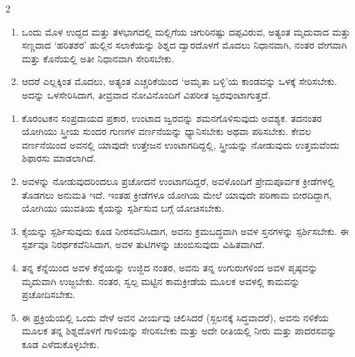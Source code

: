 \newpage

\begin{multicols}{2}
\begin{kan}
\begin{enumerate}[nosep]
\item[18.] ಒಂದು ಮೊಳ ಉದ್ದದ ಮತ್ತು ತಳಭಾಗದಲ್ಲಿ ಮಲ್ಲಿಗೆಯ ಚಿಗುರಿನಷ್ಟು ದಪ್ಪವಿರುವ, ಅತ್ಯಂತ ಮೃದುವಾದ ಮತ್ತು ಸಣ್ಣದಾದ ‘ಹರಿತಶರ’ ಹುಲ್ಲಿನ ಸಲಾಕೆಯನ್ನು ಶಿಶ್ನದ ದ್ವಾರದೊಳಗೆ ಮೊದಲು ನಿಧಾನವಾಗಿ, ನಂತರ ವೇಗವಾಗಿ ಮತ್ತು ಕೊನೆಯಲ್ಲಿ ಅತೀ ನಿಧಾನವಾಗಿ ಸೇರಿಸಬೇಕು.
\item[19.] ಆದರೆ ಎಲ್ಲಕ್ಕಿಂತ ಮೊದಲು, ಅತ್ಯಂತ ಎಚ್ಚರಿಕೆಯಿಂದ ‘ಅಮೃತಾ ಬಳ್ಳಿ’ಯ ಕಾಂಡವನ್ನು ಒಳಕ್ಕೆ ಸೇರಿಸಬೇಕು. ಅದನ್ನು ಒಳಸೇರಿಸಿದಾಗ, ತೀವ್ರವಾದ ನೋವಿನೊಂದಿಗೆ ವಿಪರೀತ ಜ್ವರವುಂಟಾಗುತ್ತದೆ.
\end{enumerate}
\vskip 7pt

\vskip 7pt


\begin{enumerate}[nosep]
\item[20.] ಕೊರಂಟಕನ ಸಂಪ್ರದಾಯದ ಪ್ರಕಾರ, ಉಂಟಾದ ಜ್ವರವನ್ನು ಶಮನಗೊಳಿಸುವುದು ಅವಶ್ಯಕ. ತದನಂತರ ಯೋಗಿಯು ಸ್ತ್ರೀಯ ಸುಂದರ ಗುಣಗಳ ವರ್ಣನೆಯನ್ನು ಧ್ಯಾನಿಸಬೇಕು ಅಥವಾ ಪಠಿಸಬೇಕು. ಕೇವಲ ವರ್ಣನೆಯಿಂದ ಅವನಲ್ಲಿ ಯಾವುದೇ ಉತ್ತೇಜನ ಉಂಟಾಗದಿದ್ದಲ್ಲಿ, ಸ್ತ್ರೀಯನ್ನು ನೋಡುವುದು ಉತ್ತಮವೆಂದು ಶಿಫಾರಸು ಮಾಡಲಾಗಿದೆ.
\item[21.] ಅವಳನ್ನು ನೋಡುವುದರಿಂದಲೂ ಪ್ರಚೋದನೆ ಉಂಟಾಗದಿದ್ದರೆ, ಅವಳೊಂದಿಗೆ ಪ್ರೇಮಪೂರ್ವಕ ಕ್ರೀಡೆಗಳಲ್ಲಿ ತೊಡಗಲು ಅನುಮತಿ ಇದೆ. ಇಂತಹ ಕ್ರೀಡೆಗಳೂ ಯೋಗಿಯ ಮೇಲೆ ಯಾವುದೇ ಪರಿಣಾಮ ಬೀರದಿದ್ದಾಗ, ಯೋಗಿಯು ಯುವತಿಯ ಕೈಯನ್ನು ಸ್ಪರ್ಶಿಸುವ ಬಗ್ಗೆ ಯೋಚಿಸಬೇಕು.
\item[22.] ಕೈಯನ್ನು ಸ್ಪರ್ಶಿಸುವುದು ಕೂಡ ನೀರಸವೆನಿಸಿದಾಗ, ಅವನು ಕ್ರಮಬದ್ಧವಾಗಿ ಅವಳ ಸ್ತನಗಳನ್ನು ಸ್ಪರ್ಶಿಸಬೇಕು. ಈ ಸ್ಪರ್ಶವೂ ನಿರರ್ಥಕವೆನಿಸಿದಾಗ, ಅವಳ ತುಟಿಗಳನ್ನು ಚುಂಬಿಸುವುದು ವಿಹಿತವಾಗಿದೆ.
\item[23.] ತನ್ನ ಕೆನ್ನೆಯಿಂದ ಅವಳ ಕೆನ್ನೆಯನ್ನು ಉಜ್ಜಿದ ನಂತರ, ಅವನು ತನ್ನ ಉಗುರುಗಳಿಂದ ಅವಳ ಪೃಷ್ಠವನ್ನು ಮೃದುವಾಗಿ ಉಜ್ಜಬೇಕು. ನಂತರ, ಸ್ವಲ್ಪ ಮಟ್ಟಿನ ಕಾಮಕ್ರೀಡೆಯ ಮೂಲಕ ಅವಳಲ್ಲಿ ಕಾಮವನ್ನು ಪ್ರಚೋದಿಸಬೇಕು.
\item[24.] ಈ ಪ್ರಕ್ರಿಯೆಯಲ್ಲಿ ಒಂದು ವೇಳೆ ಅವನ ವೀರ್ಯವು ಚಲಿಸಿದರೆ (ಸ್ಖಲನಕ್ಕೆ ಸಿದ್ಧವಾದರೆ), ಅವನು ನಳಿಕೆಯ ಮೂಲಕ ತನ್ನ ಶಿಶ್ನದೊಳಗೆ ಗಾಳಿಯನ್ನು ಸೇರಿಸಬೇಕು ಮತ್ತು ಅದೇ ರೀತಿಯಲ್ಲಿ ನೀರು ಮತ್ತು ಪಾದರಸವನ್ನು ಕೂಡ ಎಳೆದುಕೊಳ್ಳಬೇಕು.
\end{enumerate}
\columnbreak



\end{kan}
\end{multicols}
